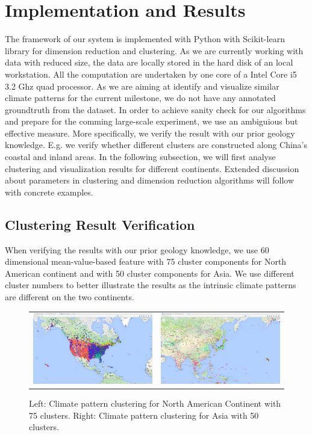 \section{Implementation and Results}
The framework of our system is implemented with Python with Scikit-learn library for dimension reduction and clustering.
As we are currently working with data with reduced size, the data are locally stored in the hard disk of an local workstation.
All the computation are undertaken by one core of a Intel Core i5 3.2 Ghz quad processor.
As we are aiming at identify and visualize similar climate patterns for the current milestone, we do not have any annotated groundtruth from the dataset.
In order to achieve sanity check for our algorithms and prepare for the comming large-scale experiment, we use an ambiguious but effective measure.
More specifically, we verify the result with our prior geology knowledge. E.g. we verify whether different clusters are constructed along China's coastal and inland areas.
In the following subsection, we will first analyse clustering and visualization results for different continents.
Extended discussion about parameters in clustering and dimension reduction algorithms will follow with concrete examples.

\subsection{Clustering Result Verification}
When verifying the results with our prior geology knowledge, we use 60 dimensional mean-value-based feature with 75 cluster components for North American continent and with 50 cluster components for Asia. We use different cluster numbers to better illustrate the results as the intrinsic climate patterns are different on the two continents. 
                    
\begin{figure}
    \centering
    \begin{tabular}{c c}
        \includegraphics[width=.45\linewidth]{./figure/Ave_60_comp_75_clu_USA.png}
        & \includegraphics[width=.45\linewidth]{./figure/Ave_60_comp_50_clu_Asia.png}
    \end{tabular}
    \label{fig:AsiaUSAVer}
    \caption{Left: Climate pattern clustering for North American Continent with 75 clusters. Right: Climate pattern clustering for Asia with 50 clusters.}
\end{figure}

